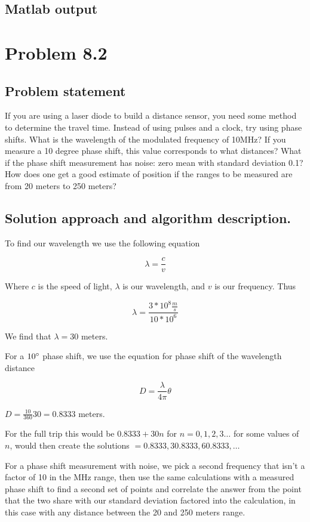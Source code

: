 \documentclass[letterpaper,11pt]{texMemo} %
\begin{document}
\subsection*{Matlab output}
\begin{tiny}

\end{tiny}

\newpage
\section*{Problem 8.2}
\subsection*{Problem statement}
If you are using a laser diode to build a distance sensor, you need some method to determine the
travel time. Instead of using pulses and a clock, try using phase shifts. What is the wavelength 
of the modulated frequency of 10MHz? If you measure a 10 degree phase shift, this value corresponds 
to what distances? What if the phase shift measurement has noise: zero mean with standard deviation 
0.1? How does one get a good estimate of position if the ranges to be measured are from 20 meters 
to 250 meters?

\subsection*{Solution approach and algorithm description.}

To find our wavelength we use the following equation

\[
    \lambda = \frac{c}{v}
\]

Where $c$ is the speed of light, $\lambda$ is our wavelength, and $v$ is our frequency. Thus

\[
    \lambda = \frac{3*10^8 \frac{m}{s}}{10*10^6}
\]

We find that $\lambda = 30$ meters.

For a $10\degree$ phase shift, we use the equation for phase shift of the wavelength distance

\[
    D = \frac{\lambda}{4\pi} \theta
\]

$D = \frac{10}{360}30 = 0.8333$ meters.

For the full trip this would be $0.8333 + 30n$ for $n = 0,1,2,3\dots$
for some values of $n$, would then create the solutions $=0.8333, 30.8333, 60.8333,\dots$

For a phase shift measurement with noise, we pick a second frequency that isn't a factor of 
10 in the MHz range, then use the same calculations with a measured phase shift to find a second
set of points and correlate the answer from the point that the two share with our standard deviation 
factored into the calculation, in this case with any distance between the 20 and 250 meters 
range.
\end{document}

